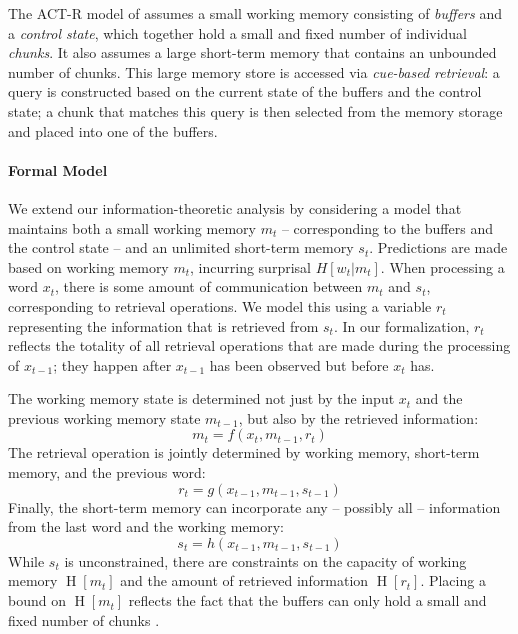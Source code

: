 \documentclass[11pt,letterpaper]{article}
\begin{document}
The ACT-R model of \cite{lewis-activation-based-2005} assumes a small working memory consisting of \emph{buffers} and a \emph{control state}, which together hold a small and fixed number of individual \emph{chunks}.
It also assumes a large short-term memory that contains an unbounded number of chunks.
This large memory store is accessed via \emph{cue-based retrieval}: a query is constructed based on the current state of the buffers and the control state; a chunk that matches this query is then selected from the memory storage and placed into one of the buffers.

\paragraph{Formal Model}
We extend our information-theoretic analysis by considering a model that maintains both a small working memory $m_t$ -- corresponding to the buffers and the control state -- and an unlimited short-term memory $s_t$.
Predictions are made based on working memory $m_t$, incurring surprisal $H[w_t|m_t]$.
When processing a word $x_t$, there is some amount of communication between $m_t$ and $s_t$, corresponding to retrieval operations.
We model this using a variable $r_t$ representing the information that is retrieved from $s_t$.
In our formalization, $r_t$ reflects the totality of all retrieval operations that are made during the processing of $x_{t-1}$; they happen after $x_{t-1}$ has been observed but before $x_t$ has.

The working memory state is determined not just by the input $x_t$ and the previous working memory state $m_{t-1}$, but also by the retrieved information:
\begin{equation}
	m_t = f(x_t, m_{t-1}, r_t) 
\end{equation}
The retrieval operation is jointly determined by working memory, short-term memory, and the previous word:
\begin{equation}\label{eq:rt}
	r_t = g(x_{t-1}, m_{t-1}, s_{t-1}) 
\end{equation}
Finally, the short-term memory can incorporate any -- possibly all -- information from the last word and the working memory:
\begin{equation}
	s_t = h(x_{t-1}, m_{t-1}, s_{t-1}) 
\end{equation}
While $s_t$ is unconstrained, there are constraints on the capacity of working memory $\operatorname{H}[m_t]$ and the amount of retrieved information $\operatorname{H}[r_t]$.
Placing a bound on $\operatorname{H}[m_t]$ reflects the fact that the buffers can only hold a small and fixed number of chunks \citep{lewis-activation-based-2005}.
\end{document}
